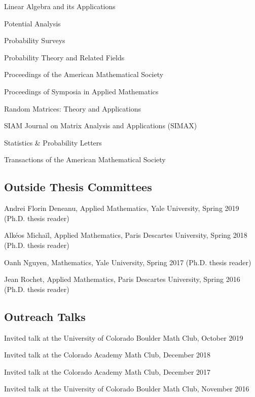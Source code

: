 \documentclass[letterpaper]{article}
\renewenvironment{itemize}{
  \begin{list}{}{
    \setlength{\leftmargin}{1em}
  }
}{
  \end{list}
}
\begin{document}
\begin{itemize}
\begin{itemize}
		\item Linear Algebra and its Applications
		\item Potential Analysis
		\item Probability Surveys
		\item Probability Theory and Related Fields
		\item Proceedings of the American Mathematical Society
		\item Proceedings of Symposia in Applied Mathematics
		\item Random Matrices: Theory and Applications
		\item SIAM Journal on Matrix Analysis and Applications (SIMAX)
		\item Statistics \& Probability Letters
		\item Transactions of the American Mathematical Society
	\end{itemize}
\end{itemize}

\subsection*{Outside Thesis Committees}
\begin{itemize}
	\item Andrei Florin Deneanu, Applied Mathematics, Yale University, Spring 2019 (Ph.D. thesis reader)
	\item  Alk\'{e}os Micha\"{i}l, Applied Mathematics, Paris Descartes University, Spring 2018 (Ph.D. thesis reader)
	\item Oanh Nguyen, Mathematics, Yale University, Spring 2017 (Ph.D. thesis reader)
	\item Jean Rochet, Applied Mathematics, Paris Descartes University, Spring 2016 (Ph.D. thesis reader)
\end{itemize}

\subsection*{Outreach Talks} 
\begin{itemize}
\item Invited talk at the University of Colorado Boulder Math Club, October 2019
\item Invited talk at the Colorado Academy Math Club, December 2018
\item Invited talk at the Colorado Academy Math Club, December 2017
\item Invited talk at the University of Colorado Boulder Math Club, November 2016
\end{itemize}
\end{document}
